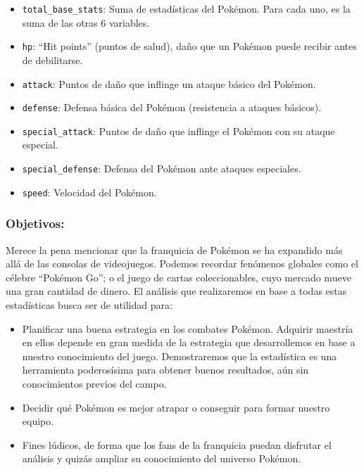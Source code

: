\documentclass[
  12pt,
]{extreport}
\begin{document}
\begin{itemize}
  \begin{itemize}
  \item
    \texttt{total\_base\_stats}: Suma de estadísticas del Pokémon. Para
    cada uno, es la suma de las otras 6 variables.
  \item
    \texttt{hp}: ``Hit points'' (puntos de salud), daño que un Pokémon
    puede recibir antes de debilitarse.
  \item
    \texttt{attack}: Puntos de daño que inflinge un ataque básico del
    Pokémon.
  \item
    \texttt{defense}: Defensa básica del Pokémon (resistencia a ataques
    básicos).
  \item
    \texttt{special\_attack}: Puntos de daño que inflinge el Pokémon con
    su ataque especial.
  \item
    \texttt{special\_defense}: Defensa del Pokémon ante ataques
    especiales.
  \item
    \texttt{speed}: Velocidad del Pokémon.
  \end{itemize}
\end{itemize}

\subsubsection{Objetivos:}\label{objetivos}

Merece la pena mencionar que la franquicia de Pokémon se ha expandido
más allá de las consolas de videojuegos. Podemos recordar fenómenos
globales como el célebre ``Pokémon Go''; o el juego de cartas
coleccionables, cuyo mercado mueve una gran cantidad de dinero. El
análisis que realizaremos en base a todas estas estadísticas busca ser
de utilidad para:

\begin{itemize}
\item
  Planificar una buena estrategia en los combates Pokémon. Adquirir
  maestría en ellos depende en gran medida de la estrategia que
  desarrollemos en base a nuestro conocimiento del juego. Demostraremos
  que la estadística es una herramienta poderosísima para obtener buenos
  resultados, aún sin conocimientos previos del campo.
\item
  Decidir qué Pokémon es mejor atrapar o conseguir para formar nuestro
  equipo.
\item
  Fines lúdicos, de forma que los fans de la franquicia puedan disfrutar
  el análisis y quizás ampliar su conocimiento del universo Pokémon.
\end{itemize}
\end{document}
